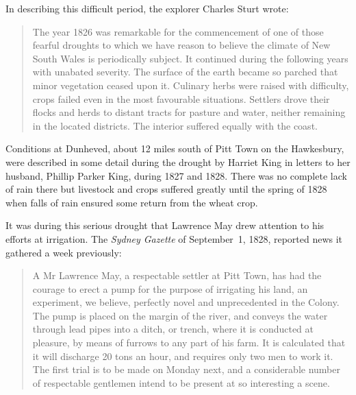 In describing this difficult period, the explorer Charles Sturt
 wrote:
\begin{quote}
	The year 1826 was remarkable for the commencement of one of
	those fearful droughts to which we have reason to believe the
	climate of New South Wales is periodically subject.  It
	continued during the following years with unabated severity.
	The surface of the earth became so parched that minor
	vegetation ceased upon it.  Culinary herbs were raised with
	difficulty, crops failed even in the most favourable
	situations.  Settlers drove their flocks and herds to distant
	tracts for pasture and water, neither remaining in the located
	districts.  The interior suffered equally with the
	coast.
\end{quote}

Conditions at Dunheved, about 12 miles south of Pitt
Town on the Hawkesbury, were described in some detail
during the drought by Harriet King  in letters to her
husband, Phillip Parker King,  during 1827 and
1828. There was no complete lack of rain there but livestock and crops
suffered greatly until the spring of 1828 when falls of rain ensured
some return from the wheat crop.

It was during this serious drought that Lawrence May drew attention to
his efforts at irrigation.  The \textsl{Sydney Gazette} of
September~1, 1828, reported news it gathered a week previously:
\begin{quote}
	A Mr Lawrence May, a respectable settler at Pitt Town, has had
	the courage to erect a pump for the purpose of irrigating his
	land, an experiment, we believe, perfectly novel and
	unprecedented in the Colony. The pump is placed on the margin
	of the river, and conveys the water through lead pipes into a
	ditch, or trench, where it is conducted at pleasure, by means
	of furrows to any part of his farm. It is calculated that it
	will discharge 20 tons an hour, and requires only two men to
	work it. The first trial is to be made on Monday next, and a
	considerable number of respectable gentlemen intend to be
	present at so interesting a scene.
\end{quote}

